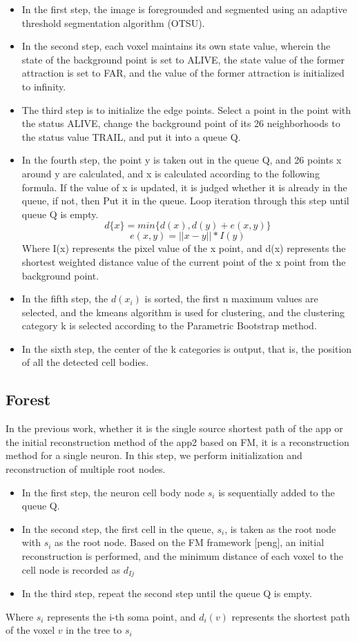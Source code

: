 \documentclass[runningheads]{llncs}
\begin{document}
\begin{itemize}
	\item In the first step, the image is foregrounded and segmented using an adaptive threshold segmentation algorithm (OTSU).
	\item In the second step, each voxel maintains its own state value, wherein the state of the background point is set to ALIVE, the state value of the former attraction is set to FAR, and the value of the former attraction is initialized to infinity.
	\item The third step is to initialize the edge points. Select a point in the point with the status ALIVE, change the background point of its 26 neighborhoods to the status value TRAIL, and put it into a queue Q.
	\item In the fourth step, the point y is taken out in the queue Q, and 26 points x around y are calculated, and x is calculated according to the following formula. If the value of x is updated, it is judged whether it is already in the queue, if not, then Put it in the queue. Loop iteration through this step until queue Q is empty.
	\begin{equation}
	d\{x\}=min\{d(x),d(y)+e(x,y)\}
	\end{equation}
	\begin{equation}
	e(x,y)=||x-y||*I(y)
	\end{equation}
	Where I(x) represents the pixel value of the x point, and d(x) represents the shortest weighted distance value of the current point of the x point from the background point.
	\item In the fifth step, the $d(x_i)$ is sorted, the first n maximum values are selected, and the kmeans algorithm is used for clustering, and the clustering category k is selected according to the Parametric Bootstrap method.
	\item In the sixth step, the center of the k categories is output, that is, the position of all the detected cell bodies.
\end{itemize}


\subsection{Forest}
In the previous work, whether it is the single source shortest path of the app or the initial reconstruction method of the app2 based on FM, it is a reconstruction method for a single neuron. In this step, we perform initialization and reconstruction of multiple root nodes.
\begin{itemize}
	\item In the first step, the neuron cell body node $s_i$ is sequentially added to the queue Q.
	\item In the second step, the first cell in the queue, $s_i$, is taken as the root node with $s_i$ as the root node. Based on the FM framework [peng], an initial reconstruction is performed, and the minimum distance of each voxel to the cell node is recorded as $d_{ Ij}$
	\item In the third step, repeat the second step until the queue Q is empty.
\end{itemize}
Where $s_i$ represents the i-th soma point, and $d_i(v)$ represents the shortest path of the voxel $v$ in the tree to $s_i$
\end{document}
